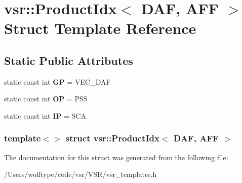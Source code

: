 \hypertarget{structvsr_1_1_product_idx_3_01_d_a_f_00_01_a_f_f_01_4}{\section{vsr\-:\-:Product\-Idx$<$ D\-A\-F, A\-F\-F $>$ Struct Template Reference}
\label{structvsr_1_1_product_idx_3_01_d_a_f_00_01_a_f_f_01_4}
}
\subsection*{Static Public Attributes}
\begin{DoxyCompactItemize}
\item 
\hypertarget{structvsr_1_1_product_idx_3_01_d_a_f_00_01_a_f_f_01_4_ac0ba99685957ebb060fe9af0fc323e5d}{static const int {\bfseries G\-P} = V\-E\-C\-\_\-\-D\-A\-F}\label{structvsr_1_1_product_idx_3_01_d_a_f_00_01_a_f_f_01_4_ac0ba99685957ebb060fe9af0fc323e5d}

\item 
\hypertarget{structvsr_1_1_product_idx_3_01_d_a_f_00_01_a_f_f_01_4_ad6b5f7fb4de860163f956ada83adcf5d}{static const int {\bfseries O\-P} = P\-S\-S}\label{structvsr_1_1_product_idx_3_01_d_a_f_00_01_a_f_f_01_4_ad6b5f7fb4de860163f956ada83adcf5d}

\item 
\hypertarget{structvsr_1_1_product_idx_3_01_d_a_f_00_01_a_f_f_01_4_a19ca47ffa17f9a29f9b072dc3b07078a}{static const int {\bfseries I\-P} = S\-C\-A}\label{structvsr_1_1_product_idx_3_01_d_a_f_00_01_a_f_f_01_4_a19ca47ffa17f9a29f9b072dc3b07078a}

\end{DoxyCompactItemize}
\subsubsection*{template$<$$>$ struct vsr\-::\-Product\-Idx$<$ D\-A\-F, A\-F\-F $>$}



The documentation for this struct was generated from the following file\-:\begin{DoxyCompactItemize}
\item 
/\-Users/wolftype/code/vsr/\-V\-S\-R/vsr\-\_\-templates.\-h\end{DoxyCompactItemize}

